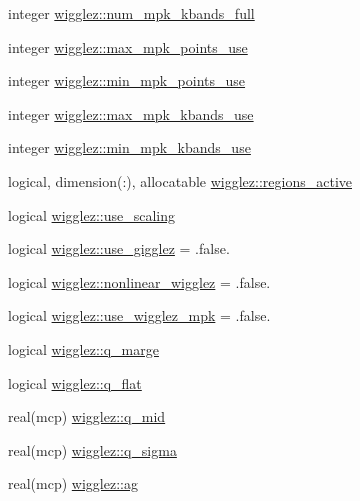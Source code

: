 \begin{DoxyCompactItemize}
\item 
integer \mbox{\hyperlink{namespacewigglez_aa43acb845d2f5a4e86a07485f5d8f0f3}{wigglez\+::num\+\_\+mpk\+\_\+kbands\+\_\+full}}
\item 
integer \mbox{\hyperlink{namespacewigglez_a5ef8736870101bebb0d86b2c5c733d8d}{wigglez\+::max\+\_\+mpk\+\_\+points\+\_\+use}}
\item 
integer \mbox{\hyperlink{namespacewigglez_aaa7aa3063584475463df9bd85fceeffd}{wigglez\+::min\+\_\+mpk\+\_\+points\+\_\+use}}
\item 
integer \mbox{\hyperlink{namespacewigglez_a7c1d18206f96a33e914468b317457ba1}{wigglez\+::max\+\_\+mpk\+\_\+kbands\+\_\+use}}
\item 
integer \mbox{\hyperlink{namespacewigglez_a1fba40082b46206664553f88666cb6aa}{wigglez\+::min\+\_\+mpk\+\_\+kbands\+\_\+use}}
\item 
logical, dimension(\+:), allocatable \mbox{\hyperlink{namespacewigglez_a4bf753383300f61cecdd5c8cd8fdaae3}{wigglez\+::regions\+\_\+active}}
\item 
logical \mbox{\hyperlink{namespacewigglez_ae38c8e45630d25b0d97109dd26bc3cd4}{wigglez\+::use\+\_\+scaling}}
\item 
logical \mbox{\hyperlink{namespacewigglez_a852cec3f5b6f650f8cfd9e8bdee9fc33}{wigglez\+::use\+\_\+gigglez}} = .false.
\item 
logical \mbox{\hyperlink{namespacewigglez_aa2c47840239c6c778e9459f43cb8d02b}{wigglez\+::nonlinear\+\_\+wigglez}} = .false.
\item 
logical \mbox{\hyperlink{namespacewigglez_a3827c735a7a159656e581a2e19c567a2}{wigglez\+::use\+\_\+wigglez\+\_\+mpk}} = .false.
\item 
logical \mbox{\hyperlink{namespacewigglez_aa9c3ad74ce4e69f0fcccd8fdda77186e}{wigglez\+::q\+\_\+marge}}
\item 
logical \mbox{\hyperlink{namespacewigglez_a60066dbf058902563e14f3196a4bd03b}{wigglez\+::q\+\_\+flat}}
\item 
real(mcp) \mbox{\hyperlink{namespacewigglez_a9d61faf004a432ee806221f52cbabd61}{wigglez\+::q\+\_\+mid}}
\item 
real(mcp) \mbox{\hyperlink{namespacewigglez_adecc221b2b57fa0a89ada696e24823d9}{wigglez\+::q\+\_\+sigma}}
\item 
real(mcp) \mbox{\hyperlink{namespacewigglez_a873b48387a22b04846288e5f2d19af1f}{wigglez\+::ag}}
\end{DoxyCompactItemize}
